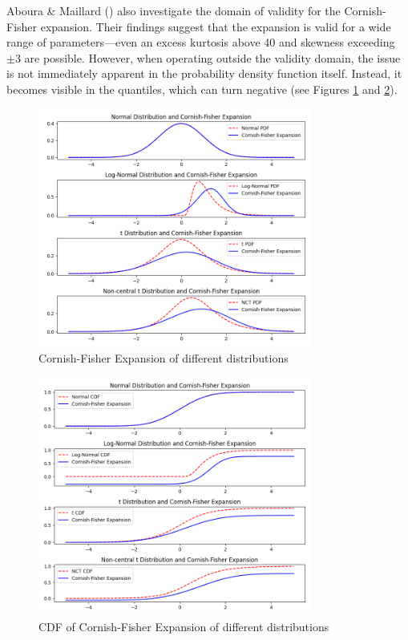 Aboura & Maillard (\citeyear{abouraOptionPricingSkewness2016}) also investigate the domain of validity for the Cornish-Fisher expansion. Their findings suggest that the expansion is valid for a wide range of parameters—even an excess kurtosis above 40 and skewness exceeding $\pm3$ are possible. However, when operating outside the validity domain, the issue is not immediately apparent in the probability density function itself. Instead, it becomes visible in the quantiles, which can turn negative (see Figures \ref{fig:cf_expansion} and \ref{fig:cf_expansion_cdf}).

\begin{figure}[h]
    \centering
    \includegraphics[width=0.8\textwidth]{img/cf_expansion.png}
    \caption{Cornish-Fisher Expansion of different distributions}
    \label{fig:cf_expansion}
\end{figure}

\begin{figure}[h]
    \centering
    \includegraphics[width=0.8\textwidth]{img/cf_expansion_cdf.png}
    \caption{CDF of Cornish-Fisher Expansion of different distributions}
    \label{fig:cf_expansion_cdf}
\end{figure}

